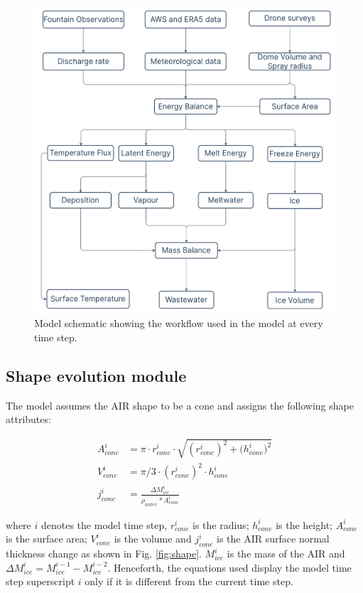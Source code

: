 \begin{figure}
	\begin{center}
		\includegraphics[width=10 cm]{figs/model_schematic.jpg}
	\end{center}
	\caption{Model schematic showing the workflow used in the model at every time step. }
	\label{fig:schema}
\end{figure}

\subsection{Shape evolution module} \label{sec:shape}

The model assumes the AIR shape to be a cone and assigns the following shape attributes:

\begin{subequations}
	\begin{align}
		\label{eq:A}
		A_{cone}^i & = \pi \cdot r_{cone}^i \cdot \sqrt{{(r_{cone}^i)}^2 + {(h_{cone}^i})^ 2} \\
		\label{eq:V}
		V_{cone}^i & = \pi/3 \cdot {(r_{cone}^i)}^2 \cdot h_{cone}^i                          \\
		\label{eq:thickness}
		j_{cone}^i & =\frac{\Delta M_{ice}^i}{\rho_{water}* A_{cone}^i}
	\end{align}
\end{subequations}

where $i$ denotes the model time step, $r_{cone}^i$ is the radius; $h_{cone}^i$ is the height; $A_{cone}^i$ is
the surface area; $V_{cone}^i$ is the volume and $j_{cone}^i$ is the AIR surface normal thickness change as shown
in Fig. \ref{fig:shape}. $M_{ice}^i$ is the mass of the AIR and $\Delta M_{ice}^i = M_{ice}^{i-1} -
	M_{ice}^{i-2}$. Henceforth, the equations used display the model time step superscript $i$ only if it is different
from the current time step.

